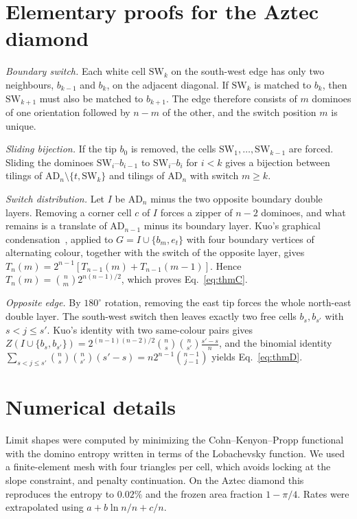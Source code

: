 \documentclass[aps,pre,twocolumn,superscriptaddress,nofootinbib,floatfix]{revtex4-2}
\newcommand{\AD}{\mathrm{AD}}
\begin{document}
\section{Elementary proofs for the Aztec diamond}
\label{app:proofs}
\emph{Boundary switch.} Each white cell $\mathrm{SW}_k$ on the south-west edge has only two neighbours, $b_{k-1}$ and $b_k$, on the adjacent diagonal. If $\mathrm{SW}_k$ is matched to $b_k$, then $\mathrm{SW}_{k+1}$ must also be matched to $b_{k+1}$. The edge therefore consists of $m$ dominoes of one orientation followed by $n-m$ of the other, and the switch position $m$ is unique.

\emph{Sliding bijection.} If the tip $b_0$ is removed, the cells $\mathrm{SW}_1,\dots,\mathrm{SW}_{k-1}$ are forced. Sliding the dominoes $\mathrm{SW}_i$--$b_{i-1}$ to $\mathrm{SW}_i$--$b_i$ for $i<k$ gives a bijection between tilings of $\AD_n\setminus\{t,\mathrm{SW}_k\}$ and tilings of $\AD_n$ with switch $m\ge k$.

\emph{Switch distribution.} Let $I$ be $\AD_n$ minus the two opposite boundary double layers. Removing a corner cell $c$ of $I$ forces a zipper of $n-2$ dominoes, and what remains is a translate of $\AD_{n-1}$ minus its boundary layer. Kuo's graphical condensation~\cite{Kuo2004}, applied to $G=I\cup\{b_m,e_t\}$ with four boundary vertices of alternating colour, together with the switch of the opposite layer, gives $T_n(m)=2^{n-1}[T_{n-1}(m)+T_{n-1}(m-1)]$. Hence $T_n(m)=\binom nm2^{n(n-1)/2}$, which proves Eq.~\eqref{eq:thmC}.

\emph{Opposite edge.} By $180^\circ$ rotation, removing the east tip forces the whole north-east double layer. The south-west switch then leaves exactly two free cells $b_s,b_{s'}$ with $s<j\le s'$. Kuo's identity with two same-colour pairs gives
$Z(I\cup\{b_s,b_{s'}\})=2^{(n-1)(n-2)/2}\binom ns\binom n{s'}\frac{s'-s}{n}$,
and the binomial identity $\sum_{s<j\le s'}\binom ns\binom n{s'}(s'-s)=n2^{n-1}\binom{n-1}{j-1}$ yields Eq.~\eqref{eq:thmD}.

\section{Numerical details}
Limit shapes were computed by minimizing the Cohn--Kenyon--Propp functional with the domino entropy written in terms of the Lobachevsky function. We used a finite-element mesh with four triangles per cell, which avoids locking at the slope constraint, and penalty continuation. On the Aztec diamond this reproduces the entropy to $0.02\%$ and the frozen area fraction $1-\pi/4$. Rates were extrapolated using $a+b\ln n/n+c/n$.
\end{document}
